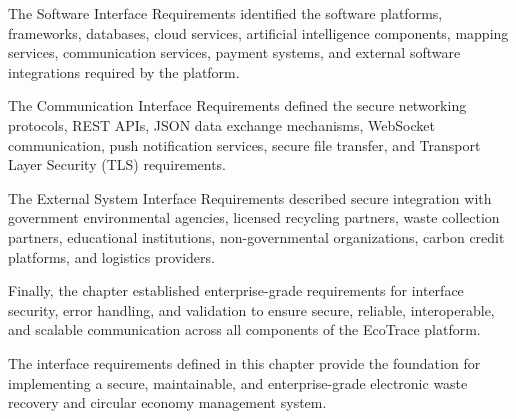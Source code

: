 The Software Interface Requirements identified the software platforms,
frameworks, databases, cloud services, artificial intelligence
components, mapping services, communication services, payment systems,
and external software integrations required by the platform.

The Communication Interface Requirements defined the secure networking
protocols, REST APIs, JSON data exchange mechanisms, WebSocket
communication, push notification services, secure file transfer, and
Transport Layer Security (TLS) requirements.

The External System Interface Requirements described secure integration
with government environmental agencies, licensed recycling partners,
waste collection partners, educational institutions,
non-governmental organizations, carbon credit platforms, and logistics
providers.

Finally, the chapter established enterprise-grade requirements for
interface security, error handling, and validation to ensure secure,
reliable, interoperable, and scalable communication across all
components of the EcoTrace platform.

The interface requirements defined in this chapter provide the
foundation for implementing a secure, maintainable, and enterprise-grade
electronic waste recovery and circular economy management system.

